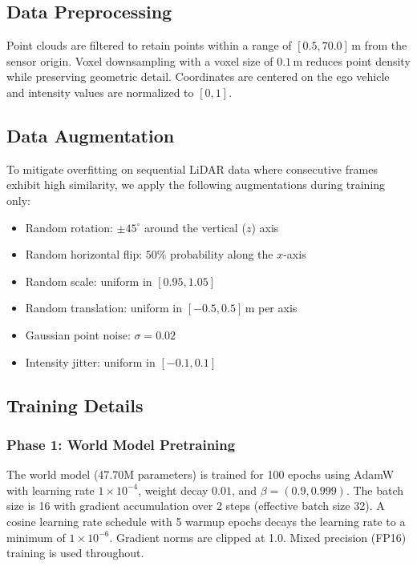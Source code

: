 \documentclass[journal]{IEEEtran}
\begin{document}
\subsection{Data Preprocessing}

Point clouds are filtered to retain points within a range of $[0.5, 70.0]$\,m from the sensor origin. Voxel downsampling with a voxel size of $0.1$\,m reduces point density while preserving geometric detail. Coordinates are centered on the ego vehicle and intensity values are normalized to $[0, 1]$.

\subsection{Data Augmentation}

To mitigate overfitting on sequential LiDAR data where consecutive frames exhibit high similarity, we apply the following augmentations during training only:
\begin{itemize}
    \item Random rotation: $\pm 45^\circ$ around the vertical ($z$) axis
    \item Random horizontal flip: $50\%$ probability along the $x$-axis
    \item Random scale: uniform in $[0.95, 1.05]$
    \item Random translation: uniform in $[-0.5, 0.5]$\,m per axis
    \item Gaussian point noise: $\sigma = 0.02$
    \item Intensity jitter: uniform in $[-0.1, 0.1]$
\end{itemize}

\subsection{Training Details}

\subsubsection{Phase 1: World Model Pretraining}
The world model (47.70M parameters) is trained for 100 epochs using AdamW \cite{loshchilov2019} with learning rate $1 \times 10^{-4}$, weight decay $0.01$, and $\beta = (0.9, 0.999)$. The batch size is 16 with gradient accumulation over 2 steps (effective batch size 32). A cosine learning rate schedule with 5 warmup epochs decays the learning rate to a minimum of $1 \times 10^{-6}$. Gradient norms are clipped at 1.0. Mixed precision (FP16) training is used throughout.
\end{document}
